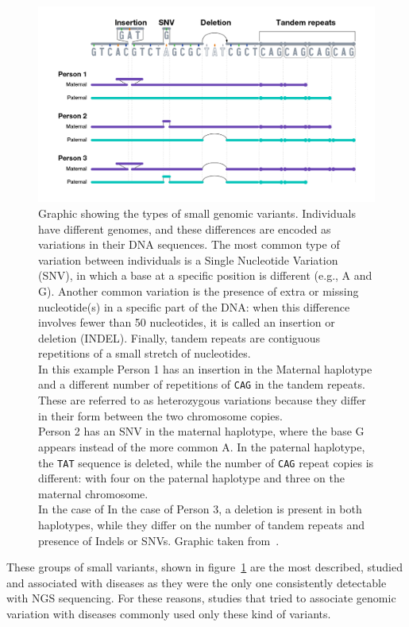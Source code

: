 \begin{figure}[!ht]
	\centering
	\includegraphics[width=\linewidth]{figures/background/small_variants.png}
	\caption[Small genomic variants.]{Graphic showing the types of small genomic variants. Individuals have different genomes, and these differences are encoded as variations in their DNA sequences. The most common type of variation between individuals is a Single Nucleotide Variation (\gls{SNV}), in which a base at a specific position is different (e.g., A and G). Another common variation is the presence of extra or missing nucleotide(s) in a specific part of the DNA: when this difference involves fewer than 50 nucleotides, it is called an insertion or deletion (INDEL). Finally, tandem repeats are contiguous repetitions of a small stretch of nucleotides.\\ In this example Person 1 has an insertion in the Maternal haplotype and a different number of repetitions of \texttt{CAG} in the tandem repeats. These are referred to as heterozygous variations because they differ in their form between the two chromosome copies.\\ Person 2 has an SNV in the maternal haplotype, where the base G appears instead of the more common A. In the paternal haplotype,  the \texttt{TAT} sequence is deleted, while the number of \texttt{CAG} repeat copies is different: with four on the paternal haplotype and three on the maternal chromosome. \\ In the case of In the case of Person 3, a deletion is present in both haplotypes, while they differ on the number of tandem repeats and presence of Indels or SNVs. Graphic taken from~\cite{nih_variation}.}
	\label{fig:small_variants}
\end{figure}
These groups of small variants, shown in figure~\ref{fig:small_variants} are the most described, studied and associated with diseases as they were the only one consistently detectable with NGS sequencing. For these reasons, studies that tried to associate genomic variation with diseases commonly used only these kind of variants.\\
